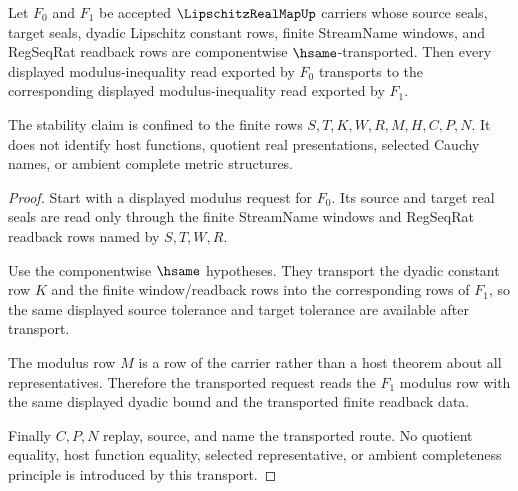 \begin{theorem}
\label{thm:lipschitz-real-map-modulus-stability}
Let $F_0$ and $F_1$ be accepted $\LipschitzRealMapUp$ carriers whose source seals, target seals, dyadic Lipschitz constant rows, finite StreamName windows, and RegSeqRat readback rows are componentwise $\hsame$-transported. Then every displayed modulus-inequality read exported by $F_0$ transports to the corresponding displayed modulus-inequality read exported by $F_1$.

The stability claim is confined to the finite rows $S,T,K,W,R,M,H,C,P,N$. It does not identify host functions, quotient real presentations, selected Cauchy names, or ambient complete metric structures.
\end{theorem}
\begin{proof}
Start with a displayed modulus request for $F_0$. Its source and target real seals are read only through the finite StreamName windows and RegSeqRat readback rows named by $S,T,W,R$.

Use the componentwise $\hsame$ hypotheses. They transport the dyadic constant row $K$ and the finite window/readback rows into the corresponding rows of $F_1$, so the same displayed source tolerance and target tolerance are available after transport.

The modulus row $M$ is a row of the carrier rather than a host theorem about all representatives. Therefore the transported request reads the $F_1$ modulus row with the same displayed dyadic bound and the transported finite readback data.

Finally $C,P,N$ replay, source, and name the transported route. No quotient equality, host function equality, selected representative, or ambient completeness principle is introduced by this transport.
\end{proof}

